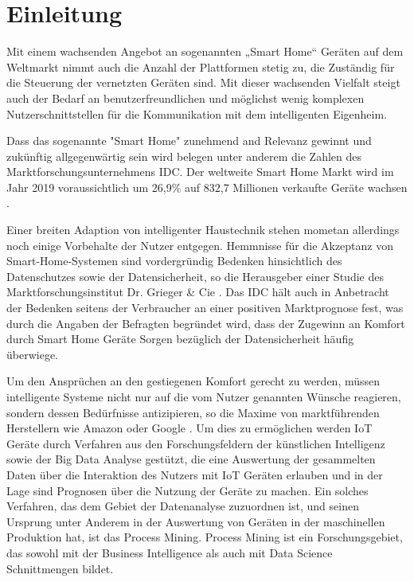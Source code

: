 \chapter{Einleitung}\label{chap:introduction}
Mit einem wachsenden Angebot an sogenannten „Smart Home“ Geräten auf dem Weltmarkt nimmt auch die Anzahl der Plattformen stetig zu, die Zuständig für die Steuerung der vernetzten Geräten sind. Mit dieser wachsenden Vielfalt steigt auch der Bedarf an benutzerfreundlichen und möglichst wenig komplexen Nutzerschnittstellen für die Kommunikation mit dem intelligenten Eigenheim. 

Dass das sogenannte "Smart Home" zunehmend and Relevanz gewinnt und zukünftig allgegenwärtig sein wird belegen unter anderem die Zahlen des  Marktforschungsunternehmens IDC. Der weltweite Smart Home Markt wird im Jahr 2019 voraussichtlich um 26,9\% auf 832,7 Millionen verkaufte Geräte wachsen \cite{IDC}.
 
Einer breiten Adaption von intelligenter Haustechnik stehen mometan allerdings noch einige Vorbehalte der Nutzer entgegen.
Hemmnisse für die Akzeptanz von Smart-Home-Systemen sind vordergründig Bedenken hinsichtlich des Datenschutzes sowie der Datensicherheit, so die Herausgeber einer Studie des Marktforschungsinstitut Dr. Grieger \& Cie \cite{griegercie}. Das IDC hält auch in Anbetracht der Bedenken seitens der Verbraucher an einer positiven Marktprognose fest, was durch die Angaben der Befragten begründet wird, dass der Zugewinn an Komfort durch Smart Home Geräte Sorgen bezüglich der Datensicherheit häufig überwiege.
 
Um den Ansprüchen an den gestiegenen Komfort gerecht zu werden, müssen intelligente Systeme nicht nur auf die vom Nutzer genannten Wünsche reagieren, sondern dessen Bedürfnisse antizipieren, so die Maxime von marktführenden Herstellern wie Amazon oder Google \cite{IoTGoogle}. Um dies zu ermöglichen werden IoT Geräte durch Verfahren aus den Forschungsfeldern der künstlichen Intelligenz sowie der Big Data Analyse gestützt, die eine Auswertung der gesammelten Daten über die Interaktion des Nutzers mit IoT Geräten erlauben und in der Lage sind Prognosen über die Nutzung der Geräte zu machen. 
\newpage
Ein solches Verfahren, das dem Gebiet der Datenanalyse zuzuordnen ist, und seinen Ursprung unter Anderem in der Auswertung von Geräten in der maschinellen Produktion hat, ist das Process Mining. Process Mining ist ein Forschungsgebiet, das sowohl mit der Business Intelligence als auch mit Data Science Schnittmengen bildet\cite{PMinAction}. 

